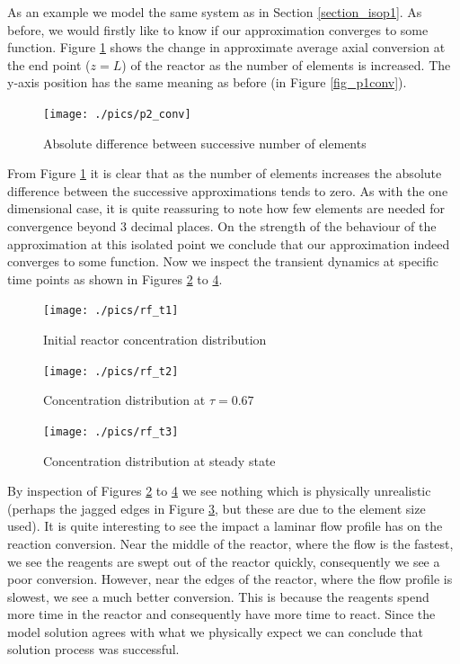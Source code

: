 \documentclass[11pt,fleqn]{article}
\theoremstyle{defstyle}
\begin{document}
As an example we model the same system as in Section \ref{section_isop1}. As before, we would firstly like to know if  our approximation converges to some function. Figure \ref{fig_p2conv} shows the change in approximate average axial conversion at the end point ($z=L$) of the reactor as the number of elements is increased. The y-axis position has the same meaning as before (in Figure \ref{fig_p1conv}). 
\begin{figure}[H] 
\centering
\texttt{[image: ./pics/p2\_conv]}
\caption{Absolute difference between successive number of elements} 
\label{fig_p2conv}
\end{figure}
From Figure \ref{fig_p2conv} it is clear that as the number of elements increases the absolute difference between the successive approximations tends to zero. As with the one dimensional case, it is quite reassuring to note how few elements are needed for convergence beyond 3 decimal places. On the strength of the behaviour of the approximation at this isolated point we conclude that our approximation indeed converges to some function. Now we inspect the transient dynamics at specific time points as shown in Figures \ref{fig_rft1} to \ref{fig_rft3}.
\begin{figure}[H] 
\centering
\texttt{[image: ./pics/rf\_t1]}
\caption{Initial reactor concentration distribution} 
\label{fig_rft1}
\end{figure}
\begin{figure}[H] 
\centering
\texttt{[image: ./pics/rf\_t2]}
\caption{Concentration distribution at $\tau=0.67$} 
\label{fig_rft2}
\end{figure}
\begin{figure}[H] 
\centering
\texttt{[image: ./pics/rf\_t3]}
\caption{Concentration distribution at steady state} 
\label{fig_rft3}
\end{figure}
By inspection of Figures \ref{fig_rft1} to \ref{fig_rft3} we see nothing which is physically unrealistic (perhaps the jagged edges in Figure \ref{fig_rft2}, but these are due to the element size used). It is quite interesting to see the impact a laminar flow profile has on the reaction conversion. Near the middle of the reactor, where the flow is the fastest, we see the reagents are swept out of the reactor quickly, consequently we see a poor conversion. However, near the edges of the reactor, where the flow profile is slowest, we see a much better conversion. This is because the reagents spend more time in the reactor and consequently have more time to react. Since the model solution agrees with what we physically expect we can conclude that solution process was successful.
\end{document}
